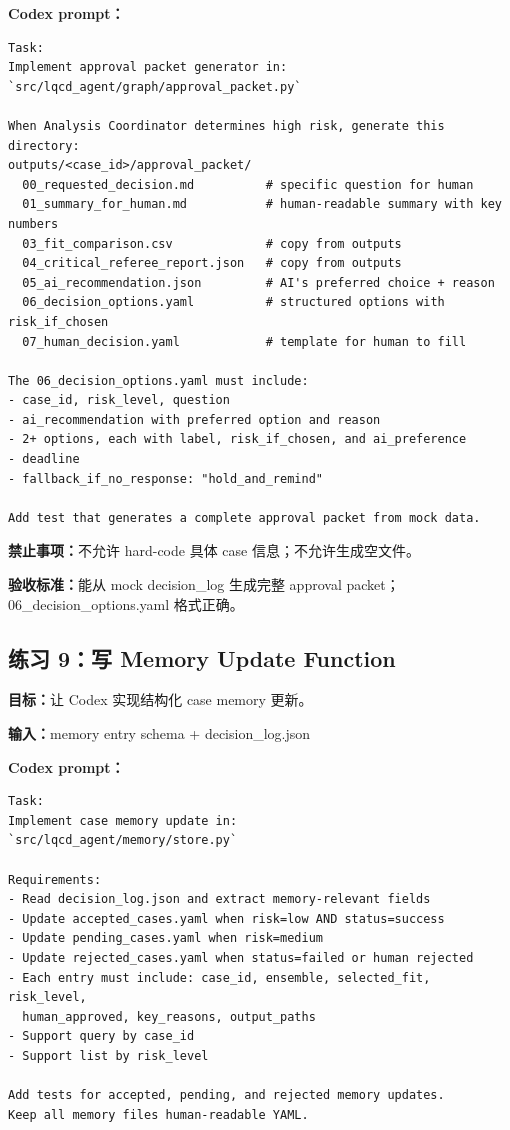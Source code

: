 \documentclass[11pt,a4paper,fontset=fandol]{ctexart}
\begin{document}
\textbf{Codex prompt：}
\begin{lstlisting}
Task:
Implement approval packet generator in:
`src/lqcd_agent/graph/approval_packet.py`

When Analysis Coordinator determines high risk, generate this directory:
outputs/<case_id>/approval_packet/
  00_requested_decision.md          # specific question for human
  01_summary_for_human.md           # human-readable summary with key numbers
  03_fit_comparison.csv             # copy from outputs
  04_critical_referee_report.json   # copy from outputs
  05_ai_recommendation.json         # AI's preferred choice + reason
  06_decision_options.yaml          # structured options with risk_if_chosen
  07_human_decision.yaml            # template for human to fill

The 06_decision_options.yaml must include:
- case_id, risk_level, question
- ai_recommendation with preferred option and reason
- 2+ options, each with label, risk_if_chosen, and ai_preference
- deadline
- fallback_if_no_response: "hold_and_remind"

Add test that generates a complete approval packet from mock data.
\end{lstlisting}

\textbf{禁止事项：}不允许 hard-code 具体 case 信息；不允许生成空文件。

\textbf{验收标准：}能从 mock decision\_log 生成完整 approval packet；06\_decision\_options.yaml 格式正确。

\subsection{练习 9：写 Memory Update Function}

\textbf{目标：}让 Codex 实现结构化 case memory 更新。

\textbf{输入：}memory entry schema + decision\_log.json

\textbf{Codex prompt：}
\begin{lstlisting}
Task:
Implement case memory update in:
`src/lqcd_agent/memory/store.py`

Requirements:
- Read decision_log.json and extract memory-relevant fields
- Update accepted_cases.yaml when risk=low AND status=success
- Update pending_cases.yaml when risk=medium
- Update rejected_cases.yaml when status=failed or human rejected
- Each entry must include: case_id, ensemble, selected_fit, risk_level, 
  human_approved, key_reasons, output_paths
- Support query by case_id
- Support list by risk_level

Add tests for accepted, pending, and rejected memory updates.
Keep all memory files human-readable YAML.
\end{lstlisting}
\end{document}
